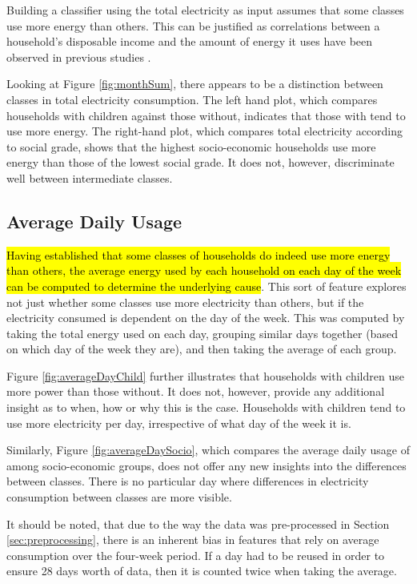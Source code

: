 Building a classifier using the total electricity as input assumes that some classes use more energy than others. This can be justified as correlations between a household's disposable income and the amount of energy it uses have been observed in previous studies \cite{Gomez}.

\monthSum %

Looking at Figure \ref{fig:monthSum}, there appears to be a distinction between classes in total electricity consumption. The left hand plot, which compares households with children against those without, indicates that those with tend to use more energy. The right-hand plot, which compares total electricity according to social grade, shows that the highest socio-economic households use more energy than those of the lowest social grade. It does not, however, discriminate well between intermediate classes.

\subsection*{Average Daily Usage}
\hl{Having established that some classes of households do indeed use more energy than others, the average energy used by each household on each day of the week can be computed to determine the underlying cause}. This sort of feature explores not just whether some classes use more electricity than others, but if the electricity consumed is dependent on the day of the week. This was computed by taking the total energy used on each day, grouping similar days together (based on which day of the week they are), and then taking the average of each group.

\averageDayChild %
\averageDaySocio %

Figure \ref{fig:averageDayChild} further illustrates that households with children use more power than those without. It does not, however, provide any additional insight as to when, how or why this is the case. Households with children tend to use more electricity per day, irrespective of what day of the week it is.

Similarly, Figure \ref{fig:averageDaySocio}, which compares the average daily usage of among socio-economic groups, does not offer any new insights into the differences between classes. There is no particular day where differences in electricity consumption between classes are more visible.

It should be noted, that due to the way the data was pre-processed in Section \ref{sec:preprocessing}, there is an inherent bias in features that rely on average consumption over the four-week period. If a day had to be reused in order to ensure 28 days worth of data, then it is counted twice when taking the average. 

